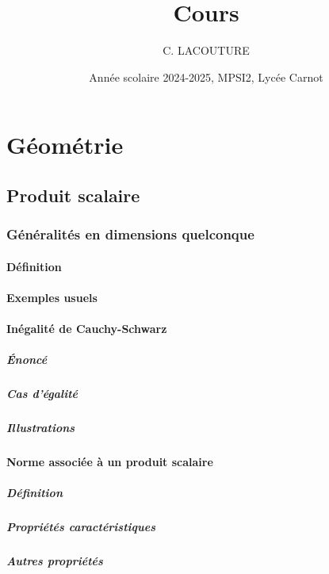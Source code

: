 \documentclass[12pt,a4paper,french]{book}
\title{Cours}
\author{C. LACOUTURE}
\date{Année scolaire 2024-2025, MPSI2, Lycée Carnot}
\begin{document}
\maketitle
\tableofcontents
\part{Géométrie}
\chapter{Produit scalaire}
	\section{Généralités en dimensions quelconque}
		\subsection{Définition}
		\subsection{Exemples usuels}
		\subsection{Inégalité de Cauchy-Schwarz}
			\subsubsection{Énoncé}
			\subsubsection{Cas d'égalité}
			\subsubsection{Illustrations}
		\subsection{Norme associée à un produit scalaire}
			\subsubsection{Définition}
			\subsubsection{Propriétés caractéristiques}
			\subsubsection{Autres propriétés}
\end{document}
